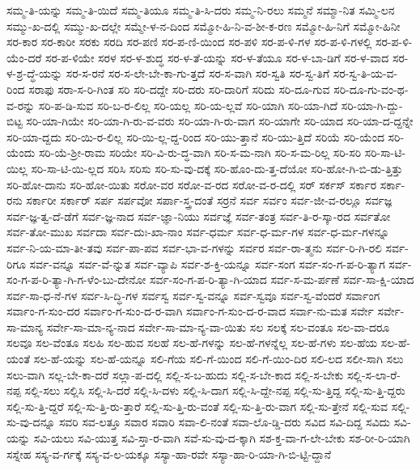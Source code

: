 {ಸಮ್ಮ-ತಿ-ಯನ್ನು
ಸಮ್ಮ-ತಿ-ಯಿದೆ
ಸಮ್ಮ-ತಿಯೂ
ಸಮ್ಮ-ತಿ-ಸಿ-ದರು
ಸಮ್ಮ-ನಿ-ರಲು
ಸಮ್ಮನೆ
ಸಮ್ಮಾ-ನಿತ
ಸಮ್ಮಿ-ಲನ
ಸಮ್ಮು-ಖ-ದಲ್ಲಿ
ಸಮ್ಮು-ಖ-ದಲ್ಲೇ
ಸಮ್ಮೇ-ಳ-ನ-ದಿಂದ
ಸಮ್ಮೋ-ಹಿ-ನಿ-ವ-ಶೀ-ಕ-ರಣ
ಸಮ್ಮೋ-ಹಿ-ನಿಗೆ
ಸಮ್ಮೋ-ಹಿನೀ
ಸರ-ಕಾರ
ಸರ-ಕಾರೀ
ಸರಕು
ಸರದಿ
ಸರ-ಪಣಿ
ಸರ-ಪ-ಣಿ-ಯಿಂದ
ಸರ-ಪಳಿ
ಸರ-ಪ-ಳಿ-ಗಳ
ಸರ-ಪ-ಳಿ-ಗಳಲ್ಲಿ
ಸರ-ಪ-ಳಿ-ಯೆಂ-ದರೆ
ಸರ-ಪ-ಳಿಯೇ
ಸರಳ
ಸರ-ಳ-ಶುದ್ಧ
ಸರ-ಳ-ತೆ-ಯನ್ನು
ಸರ-ಳ-ತೆಯೂ
ಸರ-ಳ-ಬಾ-ಡಿಗೆ
ಸರ-ಳ-ವಾದ
ಸರ-ಳ-ಶ್ರ-ದ್ಧೆ-ಯನ್ನು
ಸರ-ಸ-ರನೆ
ಸರ-ಸ-ಲೇ-ಬೇ-ಕಾ-ಗು-ತ್ತದೆ
ಸರ-ಸ-ವಾಗಿ
ಸರ-ಸ್ವತಿ
ಸರ-ಸ್ವ-ತಿಗೆ
ಸರ-ಸ್ವ-ತಿ-ಯ-ವ-ರಿಂದ
ಸರಾಫು
ಸರಾ-ಸ-ರಿ-ಗಿಂತ
ಸರಿ
ಸರಿ-ದದ್ದೇ
ಸರಿ-ದರು
ಸರಿ-ದಾರಿಗೆ
ಸರಿದು
ಸರಿ-ದೂ-ಗುವ
ಸರಿ-ದೂ-ಗು-ವಂ-ಥ-ವ-ರನ್ನು
ಸರಿ-ಪ-ಡಿ-ಸುವ
ಸರಿ-ಬ-ರ-ಲಿಲ್ಲ
ಸರಿ-ಯಲ್ಲ
ಸರಿ-ಯ-ಲ್ಲವೆ
ಸರಿ-ಯಾಗಿ
ಸರಿ-ಯಾ-ಗಿದೆ
ಸರಿ-ಯಾ-ಗಿ-ದ್ದು-ಬಿಟ್ಟ
ಸರಿ-ಯಾ-ಗಿಯೇ
ಸರಿ-ಯಾ-ಗಿ-ರು-ವ-ವರು
ಸರಿ-ಯಾ-ಗಿ-ರು-ವಾಗ
ಸರಿ-ಯಾಗೇ
ಸರಿ-ಯಾದ
ಸರಿ-ಯಾ-ದ-ದ್ದನ್ನೇ
ಸರಿ-ಯಾ-ದ್ದದು
ಸರಿ-ಯಿ-ರ-ಲಿಲ್ಲ
ಸರಿ-ಯಿ-ಲ್ಲ-ದ್ದ-ರಿಂದ
ಸರಿ-ಯು-ತ್ತಾನೆ
ಸರಿ-ಯು-ತ್ತಿದೆ
ಸರಿಯೆ
ಸರಿ-ಯೆಂದ
ಸರಿ-ಯೆಂದು
ಸರಿ-ಯೆ-ಶ್ರೀ-ರಾಮ
ಸರಿಯೇ
ಸರಿ-ವಿ-ರು-ದ್ಧ-ವಾಗಿ
ಸರಿ-ಸ-ಮ-ನಾಗಿ
ಸರಿ-ಸ-ಮ-ರಿಲ್ಲ
ಸರಿ-ಸರಿ
ಸರಿ-ಸಾ-ಟಿ-ಯಿಲ್ಲ
ಸರಿ-ಸಾ-ಟಿ-ಯಿ-ಲ್ಲದ
ಸರಿಸಿ
ಸರಿಸು
ಸರಿ-ಸು-ವು-ದಕ್ಕೆ
ಸರಿ-ಹೊಂ-ದು-ತ್ತ-ದೆಯೋ
ಸರಿ-ಹೋ-ಗಿ-ಬಿ-ಡು-ತ್ತಿತ್ತು
ಸರಿ-ಹೋ-ದಾನು
ಸರಿ-ಹೋ-ಯಿತು
ಸರೋ-ವರ
ಸರೋ-ವ-ರದ
ಸರೋ-ವ-ರ-ದಲ್ಲಿ
ಸರ್
ಸರ್ಕಸ್
ಸರ್ಕಾರ
ಸರ್ಕಾ-ರನು
ಸರ್ಕಾರೀ
ಸರ್ಕಾರ್
ಸರ್ಪ
ಸರ್ಪವೋ
ಸರ್ಪಾ-ಸ್ತ್ರ-ದಂತೆ
ಸರ್ರನೆ
ಸರ್ವ
ಸರ್ವಂ
ಸರ್ವ-ಜೀ-ವ-ರಲ್ಲೂ
ಸರ್ವಜ್ಞ
ಸರ್ವ-ಜ್ಞ-ತ್ವ-ದೆ-ಡೆಗೆ
ಸರ್ವ-ಜ್ಞ-ನಾದ
ಸರ್ವ-ಜ್ಞಾ-ನಿಯು
ಸರ್ವಜ್ಞೆ
ಸರ್ವ-ತಂತ್ರ
ಸರ್ವ-ತಿ-ರ-ಸ್ಕಾ-ರದ
ಸರ್ವತೋ
ಸರ್ವ-ತೋ-ಮುಖ
ಸರ್ವದಾ
ಸರ್ವ-ದುಃ-ಖಾ-ನಾಂ
ಸರ್ವ-ಧರ್ಮ
ಸರ್ವ-ಧ-ರ್ಮ-ಗಳ
ಸರ್ವ-ಧ-ರ್ಮ-ಗಳನ್ನೂ
ಸರ್ವ-ನಿ-ಯ-ಮಾ-ತೀ-ತವು
ಸರ್ವ-ಪಾ-ಪವ
ಸರ್ವ-ಭಾ-ವ-ಗಳನ್ನು
ಸರ್ವರ
ಸರ್ವ-ರಾ-ತ್ಮನು
ಸರ್ವ-ರಿ-ಗಿ-ರಲಿ
ಸರ್ವ-ರಿಗೂ
ಸರ್ವ-ವನ್ನೂ
ಸರ್ವ-ವೆ-ನ್ನುತ
ಸರ್ವ-ವ್ಯಾಪಿ
ಸರ್ವ-ಶ-ಕ್ತಿ-ಯನ್ನೂ
ಸರ್ವ-ಸಂಗ
ಸರ್ವ-ಸಂ-ಗ-ಪ-ರಿ-ತ್ಯಾಗ
ಸರ್ವ-ಸಂ-ಗ-ಪ-ರಿ-ತ್ಯಾ-ಗಿ-ಗ-ಳೆಂ-ಬು-ದೇನೋ
ಸರ್ವ-ಸಂ-ಗ-ಪ-ರಿ-ತ್ಯಾ-ಗಿ-ಯಾದ
ಸರ್ವ-ಸ-ಮ-ರ್ಪಣೆ
ಸರ್ವ-ಸಾ-ಕ್ಷಿ-ಯಾದ
ಸರ್ವ-ಸಾ-ಧ-ನೆ-ಗಳ
ಸರ್ವ-ಸಿ-ದ್ಧಿ-ಗಳ
ಸರ್ವಸ್ವ
ಸರ್ವ-ಸ್ವ-ವನ್ನೂ
ಸರ್ವ-ಸ್ವವೂ
ಸರ್ವ-ಸ್ವ-ವೆಂದರೆ
ಸರ್ವಾಂಗ
ಸರ್ವಾಂ-ಗ-ಸುಂ-ದರ
ಸರ್ವಾಂ-ಗ-ಸುಂ-ದ-ರ-ವಾಗಿ
ಸರ್ವಾಂ-ಗ-ಸುಂ-ದ-ರ-ವಾದ
ಸರ್ವಾ-ನು-ಮತ
ಸರ್ವೇ
ಸರ್ವೇ-ಸಾ-ಮಾನ್ಯ
ಸರ್ವೇ-ಸಾ-ಮಾ-ನ್ಯ-ನಾದ
ಸರ್ವೇ-ಸಾ-ಮಾ-ನ್ಯ-ವಾ-ಯಿತು
ಸಲ
ಸಲಕ್ಕೆ
ಸಲ-ವಂತೂ
ಸಲ-ವಾ-ದರೂ
ಸಲವೂ
ಸಲ-ವೆಂತೂ
ಸಲಹಿ
ಸಲ-ಹುವ
ಸಲಹೆ
ಸಲ-ಹೆ-ಗಳನ್ನು
ಸಲ-ಹೆ-ಗಳನ್ನೆಲ್ಲ
ಸಲ-ಹೆ-ಗಳು
ಸಲ-ಹೆಯ
ಸಲ-ಹೆ-ಯಂತೆ
ಸಲ-ಹೆ-ಯನ್ನು
ಸಲ-ಹೆ-ಯನ್ನೂ
ಸಲಿ-ಗೆಯ
ಸಲಿ-ಗೆ-ಯಿಂದ
ಸಲಿ-ಗೆ-ಯಿಂ-ದಿರ
ಸಲಿ-ಲದ
ಸಲೀ-ಸಾಗಿ
ಸಲು
ಸಲು-ವಾಗಿ
ಸಲ್ಲ-ಬೇ-ಕಾ-ದರೆ
ಸಲ್ಲಾ-ಪ-ದಲ್ಲಿ
ಸಲ್ಲಿ-ಸ-ಬ-ಹುದು
ಸಲ್ಲಿ-ಸ-ಬೇ-ಕಾದ
ಸಲ್ಲಿ-ಸ-ಬೇಕು
ಸಲ್ಲಿ-ಸ-ಲಾ-ರೆ-ನಪ್ಪ
ಸಲ್ಲಿ-ಸಲು
ಸಲ್ಲಿಸಿ
ಸಲ್ಲಿ-ಸಿ-ದರೆ
ಸಲ್ಲಿ-ಸಿ-ದಳು
ಸಲ್ಲಿ-ಸಿ-ದಾಗ
ಸಲ್ಲಿ-ಸಿ-ದ್ದೇ-ನಪ್ಪ
ಸಲ್ಲಿ-ಸು-ತ್ತಿದ್ದ
ಸಲ್ಲಿ-ಸು-ತ್ತಿ-ದ್ದರು
ಸಲ್ಲಿ-ಸು-ತ್ತಿ-ದ್ದರೆ
ಸಲ್ಲಿ-ಸು-ತ್ತಿ-ರು-ತ್ತಾರೆ
ಸಲ್ಲಿ-ಸು-ತ್ತಿ-ರು-ವಂತೆ
ಸಲ್ಲಿ-ಸು-ತ್ತಿ-ರು-ವಾಗ
ಸಲ್ಲಿ-ಸು-ತ್ತೇನೆ
ಸಲ್ಲಿ-ಸುವ
ಸಲ್ಲಿ-ಸು-ವು-ದನ್ನೂ
ಸವರಿ
ಸವ-ಲತ್ತೂ
ಸವಾರ
ಸವಾರಿ
ಸವಾ-ಲಿ-ನಂತೆ
ಸವಾ-ಲೊ-ಡ್ಡಿ-ದರು
ಸವಿದ
ಸವಿ-ದಿದ್ದ
ಸವಿದು
ಸವಿ-ಯನ್ನು
ಸವಿ-ಯಲು
ಸವಿ-ಯುತ್ತ
ಸವಿ-ಸ್ತಾ-ರ-ವಾಗಿ
ಸವೆ-ಸು-ವು-ದ-ಕ್ಕಾಗಿ
ಸಶ-ಕ್ತ-ವಾ-ಗ-ಲೇ-ಬೇಕು
ಸಶ-ರೀ-ರಿ-ಯಾಗಿ
ಸಸ್ನೇಹ
ಸಸ್ಯ-ವ-ರ್ಗಕ್ಕೆ
ಸಸ್ಯ-ವ-ಲ-ಯಕ್ಕೂ
ಸಸ್ಯಾ-ಹಾ-ರವೇ
ಸಸ್ಯಾ-ಹಾ-ರಿ-ಯಾ-ಗಿ-ಬಿ-ಟ್ಟಿ-ದ್ದಾನೆ
}

